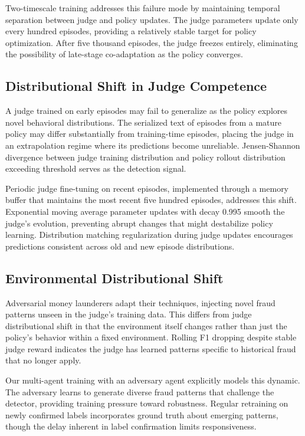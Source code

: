 \documentclass[11pt,a4paper]{article}
\begin{document}
Two-timescale training addresses this failure mode by maintaining temporal separation between judge and policy updates. The judge parameters update only every hundred episodes, providing a relatively stable target for policy optimization. After five thousand episodes, the judge freezes entirely, eliminating the possibility of late-stage co-adaptation as the policy converges.

\subsection{Distributional Shift in Judge Competence}

A judge trained on early episodes may fail to generalize as the policy explores novel behavioral distributions. The serialized text of episodes from a mature policy may differ substantially from training-time episodes, placing the judge in an extrapolation regime where its predictions become unreliable. Jensen-Shannon divergence between judge training distribution and policy rollout distribution exceeding threshold serves as the detection signal.

Periodic judge fine-tuning on recent episodes, implemented through a memory buffer that maintains the most recent five hundred episodes, addresses this shift. Exponential moving average parameter updates with decay 0.995 smooth the judge's evolution, preventing abrupt changes that might destabilize policy learning. Distribution matching regularization during judge updates encourages predictions consistent across old and new episode distributions.

\subsection{Environmental Distributional Shift}

Adversarial money launderers adapt their techniques, injecting novel fraud patterns unseen in the judge's training data. This differs from judge distributional shift in that the environment itself changes rather than just the policy's behavior within a fixed environment. Rolling F1 dropping despite stable judge reward indicates the judge has learned patterns specific to historical fraud that no longer apply.

Our multi-agent training with an adversary agent explicitly models this dynamic. The adversary learns to generate diverse fraud patterns that challenge the detector, providing training pressure toward robustness. Regular retraining on newly confirmed labels incorporates ground truth about emerging patterns, though the delay inherent in label confirmation limits responsiveness.
\end{document}
